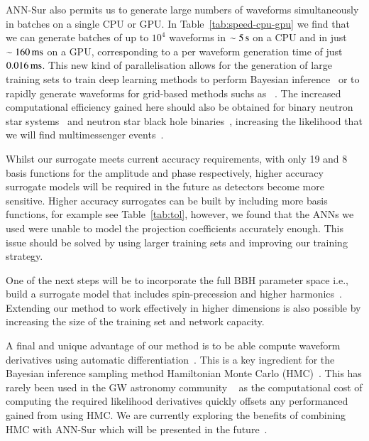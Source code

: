 \documentclass[aps,prd,reprint,superscriptaddress,preprintnumbers,showpacs,nofootinbib]{revtex4-1}
\begin{document}
ANN-Sur also permits us to generate large numbers of waveforms simultaneously in
batches on a single CPU or GPU. In Table~\ref{tab:speed-cpu-gpu} we find that we
can generate batches of up to $10^{4}$ waveforms in $\sim 5 \, {\rm{s}}$ on a
CPU and in just $\sim 160 \, {\rm{ms}}$ on a GPU, corresponding to a per
waveform generation time of just $0.016 \, {\rm{ms}}$. This new kind of
parallelisation allows for the generation of large training sets to train deep
learning methods to perform Bayesian
inference~\cite{Chua2020LearningBP,Gabbard2019BayesianPE,Green2020CompletePI} or
to rapidly generate waveforms for grid-based methods suchs as
~\cite{Pankow2015NovelSF,Lange2018RapidAA,Wysocki2019AcceleratingPI}. The
increased computational efficiency gained here should also be obtained for
binary neutron star systems~\cite{Dietrich2019MatterII,Nagar2018TimedomainEG}
and neutron star black hole
binaries~\cite{Thompson2020ModelingTG,Matas2020AnAN}, increasing the likelihood
that we will find multimessenger events~\cite{GBM:2017lvd}.

Whilst our surrogate meets current accuracy requirements, with only 19 and 8
basis functions for the amplitude and phase respectively, higher accuracy
surrogate models will be required in the future as detectors become more
sensitive. Higher accuracy surrogates can be built by including more basis
functions, for example see Table~\ref{tab:tol}, however, we found that the ANNs
we used were unable to model the projection coefficients accurately enough. This
issue should be solved by using larger training sets and improving our training
strategy.

One of the next steps will be to incorporate the full BBH parameter space i.e.,
build a surrogate model that includes spin-precession and higher
harmonics~\cite{PhysRevResearch.1.033015,PhysRevD.96.024058,2020arXiv200409442O,Khan2020IncludingHO,Pratten2020LetsTA}.
Extending our method to work effectively in higher dimensions is also possible
by increasing the size of the training set and network capacity.

A final and unique advantage of our method is to be able compute waveform
derivatives using automatic differentiation~\cite{2018arXiv181105031M}. This is
a key ingredient for the Bayesian inference sampling method Hamiltonian Monte
Carlo (HMC)~\cite{DUANE1987216,Neal2011MCMCUH,Betancourt2017ACI}. This has
rarely been used in the GW astronomy community
~\cite{Porter2014AHM,Bouffanais2018BayesianIF} as the computational cost of
computing the required likelihood derivatives quickly offsets any performanced
gained from using HMC. We are currently exploring the benefits of combining HMC
with ANN-Sur which will be presented in the future~\cite{GreenKhanInPrep}.
\end{document}
